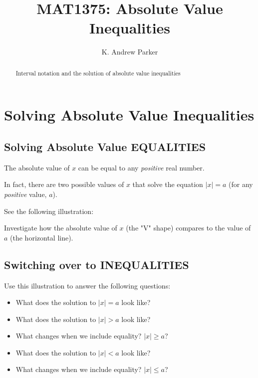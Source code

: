 \documentclass{ximera}
\title{MAT1375: Absolute Value Inequalities}
\author{K. Andrew Parker}
\begin{document}
\begin{abstract}
Interval notation and the solution of absolute value inequalities
\end{abstract}

\maketitle

\section{Solving Absolute Value Inequalities}

\subsection{Solving Absolute Value EQUALITIES}

The absolute value of $x$ can be equal to any \emph{positive} real number.

In fact, there are two possible values of $x$ that solve the equation $|x|=a$ (for any \emph{positive} value, $a$).

See the following illustration:

Investigate how the absolute value of $x$ (the "V" shape) compares to the value of $a$ (the horizontal line).

\begin{center}
\end{center}

\subsection{Switching over to INEQUALITIES}

\begin{center}
\end{center}

Use this illustration to answer the following questions:

\begin{itemize}
 \item What does the solution to $|x| = a$ look like?
 \item What does the solution to $|x| > a$ look like?
 \item What changes when we include equality? $|x| \geq a$?
 \item What does the solution to $|x| < a$ look like?
 \item What changes when we include equality? $|x| \leq a$?
\end{itemize}

\begin{center}
\end{center}
\end{document}

